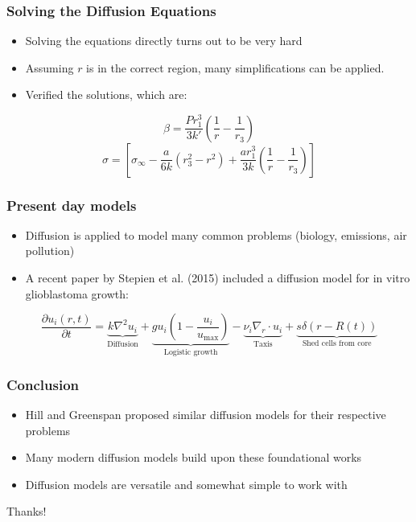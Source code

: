 \documentclass{beamer}
\begin{document}
\begin{frame}
  \frametitle{Solving the Diffusion Equations}
  \begin{itemize}
    \item Solving the equations directly turns out to be very hard
    \item Assuming $r$ is in the correct region, many simplifications can be applied.
    \item Verified the solutions, which are: 
  \end{itemize}
  \begin{equation}
    \beta = \frac{Pr_1^3}{3k'}(\frac{1}{r} - \frac{1}{r_3})
  \end{equation}
  \begin{equation}
    \sigma = [\sigma_{\infty} - \frac{a}{6k}(r_3^2 - r^2) + \frac{ar_1^3}{3k} (\frac{1}{r} - \frac{1}{r_3})]
\end{equation}
\end{frame}

\begin{frame}
  \frametitle{Present day models}
  \begin{itemize}
    \item Diffusion is applied to model many common problems (biology, emissions, air pollution)
    \item A recent paper by Stepien et al. (2015) included a diffusion model for in vitro glioblastoma growth:
  \end{itemize}
  \begin{equation}
    \frac{\partial u_i(r, t)}{\partial t} = \underset{\text{Diffusion}}{\underbrace{k \nabla^2 u_i}} + \underset{\text{Logistic growth}}{\underbrace{g u_i \left(1 - \frac{u_i}{u_{\max}}\right)}} - \underset{\text{Taxis}}{\underbrace{\nu_i \nabla_r \cdot u_i}} + \underset{\text{Shed cells from core}}{\underbrace{s \delta(r - R(t))}}
  \end{equation}

\end{frame}


\begin{frame}
  \frametitle{Conclusion}
  \begin{itemize}
    \item Hill and Greenspan proposed similar diffusion models for their respective problems
    \item Many modern diffusion models build upon these foundational works
    \item Diffusion models are versatile and somewhat simple to work with
  \end{itemize}

  Thanks!
\end{frame}
\end{document}
